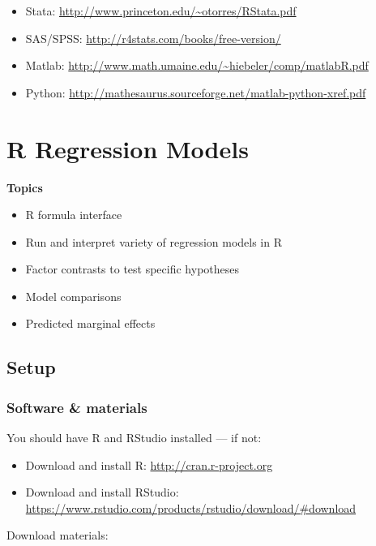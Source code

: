 \documentclass[]{book}
\providecommand{\tightlist}{%
  \setlength{\itemsep}{0pt}\setlength{\parskip}{0pt}}
\begin{document}
\begin{itemize}
  \begin{itemize}
  \tightlist
  \item
    Stata: \url{http://www.princeton.edu/~otorres/RStata.pdf}
  \item
    SAS/SPSS: \url{http://r4stats.com/books/free-version/}
  \item
    Matlab: \url{http://www.math.umaine.edu/~hiebeler/comp/matlabR.pdf}
  \item
    Python:
    \url{http://mathesaurus.sourceforge.net/matlab-python-xref.pdf}
  \end{itemize}
\end{itemize}

\chapter{R Regression Models}\label{r-regression-models}

\textbf{Topics}

\begin{itemize}
\tightlist
\item
  R formula interface
\item
  Run and interpret variety of regression models in R
\item
  Factor contrasts to test specific hypotheses
\item
  Model comparisons
\item
  Predicted marginal effects
\end{itemize}

\section{Setup}\label{setup-1}

\subsection{Software \& materials}\label{software-materials-1}

You should have R and RStudio installed --- if not:

\begin{itemize}
\tightlist
\item
  Download and install R: \url{http://cran.r-project.org}
\item
  Download and install RStudio:
  \url{https://www.rstudio.com/products/rstudio/download/\#download}
\end{itemize}

Download materials:
\end{document}
